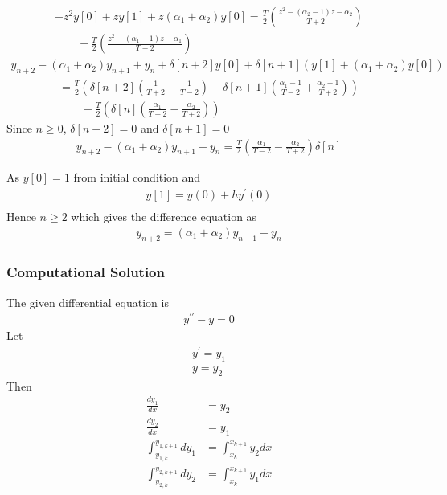 \documentclass{beamer}
\providecommand{\sbrak}[1]{\ensuremath{{}\left[#1\right]}}
\providecommand{\brak}[1]{\ensuremath{\left(#1\right)}}
\theoremstyle{remark}
\numberwithin{equation}{section}
\begin{document}
\begin{frame}
\begin{align}
  +z^2y\sbrak{0}+zy\sbrak{1}+z\brak{\alpha_1+\alpha_2}y\sbrak{0} = \frac{T}{2}\brak{\frac{z^2-\brak{\alpha_2-1}z-\alpha_2}{T+2}}\nonumber \\
  \qquad-\frac{T}{2}\brak{\frac{z^2-\brak{\alpha_1-1}z-\alpha_1}{T-2}}
\end{align}
\begin{align}
  y_{n+2}-\brak{\alpha_1+\alpha_2}y_{n+1}+y_n+\delta\sbrak{n+2}y\sbrak{0}+\delta\sbrak{n+1}\brak{y\sbrak{1}+\brak{\alpha_1+\alpha_2}y\sbrak{0}}\nonumber
\end{align}
\begin{align}
= \frac{T}{2}\brak{\delta\sbrak{n+2}\brak{\frac{1}{T+2}-\frac{1}{T-2}}-\delta\sbrak{n+1}\brak{\frac{\alpha_1-1}{T-2}+\frac{\alpha_2-1}{T+2}}}\nonumber \\
  \qquad+\frac{T}{2}\brak{\delta\sbrak{n}\brak{\frac{\alpha_1}{T-2}-\frac{\alpha_2}{T+2}}}
\end{align}
Since $n\ge 0$, $\delta\sbrak{n+2} = 0$ and $\delta\sbrak{n+1} = 0$
\begin{align}
	 y_{n+2}-\brak{\alpha_1+\alpha_2}y_{n+1}+y_n = \frac{T}{2}\brak{\frac{\alpha_1}{T-2}-\frac{\alpha_2}{T+2}}\delta\sbrak{n}
\end{align}
\end{frame}
\begin{frame}
As $y\sbrak{0} = 1$ from initial condition and
\begin{align}
y\sbrak{1}=y\brak{0} + hy^\prime\brak{0}\\
\end{align}
Hence $n\ge 2$ which gives the difference equation as
\begin{align}
	y_{n+2} = \brak{\alpha_1+\alpha_2}y_{n+1} - y_n
\end{align}
\end{frame}
\frametitle{Computational Solution}
\begin{frame}
The given differential equation is
\begin{align}
	y^{\prime\prime} - y = 0
\end{align}
Let
\begin{align}
	y^\prime = y_1\\
	y = y_2
\end{align}
Then
\begin{align}
	\frac{dy_1}{dx} &= y_2\\
	\frac{dy_2}{dx} &= y_1\\
	\int_{y_{1,k}}^{y_{1,k+1}}dy_1 &= \int_{x_k}^{x_{k+1}}y_2dx\\
	\int_{y_{2,k}}^{y_{2,k+1}}dy_2 &= \int_{x_k}^{x_{k+1}}y_1dx
\end{align}
\end{frame}
\end{document}
